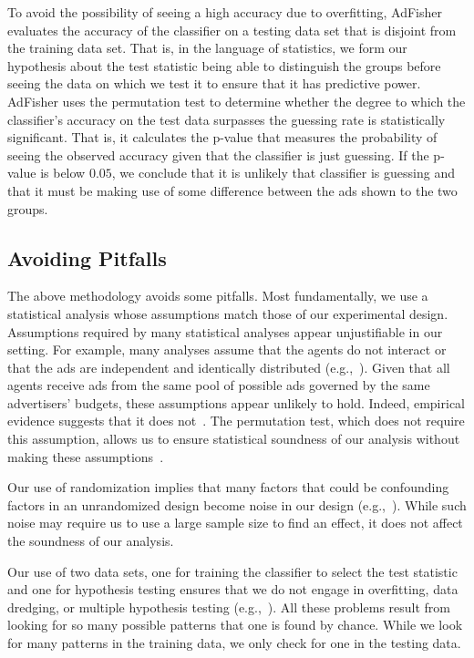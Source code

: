 \documentclass{article}
\begin{document}
To avoid the possibility of seeing a high accuracy due to overfitting, AdFisher evaluates the accuracy of the classifier on a testing data set that is disjoint from the training data set.  That is, in the language of statistics, we form our hypothesis about the test statistic being able to distinguish the groups before seeing the data on which we test it to ensure that it has predictive power.  AdFisher uses the permutation test to determine whether the degree to which the classifier's accuracy on the test data surpasses the guessing rate is statistically significant.  That is, it calculates the p-value that measures the probability of seeing the observed accuracy given that the classifier is just guessing.  If the p-value is below $0.05$, we conclude that it is unlikely that classifier is guessing and that it must be making use of some difference between the ads shown to the two groups.





\subsection{Avoiding Pitfalls}
\label{sec:pitfalls}
The above methodology avoids some pitfalls.
Most fundamentally, we use a statistical analysis whose assumptions match those of our experimental design.
Assumptions required by many statistical analyses appear unjustifiable in our setting.  
For example, many analyses assume that the agents do not interact or that the ads are independent and identically distributed (e.g.,~\cite{barford14www,englehardt14man}).  
Given that all agents receive ads from the same pool of possible ads governed by the same advertisers' budgets, these assumptions appear unlikely to hold.
Indeed, empirical evidence suggests that it does not~\cite{tschantz14arxiv}.
The permutation test, which does not require this assumption, allows us to ensure  statistical soundness of our analysis without making these assumptions~\cite{greenland86epidemiology}.

Our use of randomization implies that many factors that could be confounding factors in an unrandomized design become noise in our design (e.g.,~\cite{good05book}).  While such noise may require us to use a large sample size to find an effect, it does not affect the soundness of our analysis.

Our use of two data sets, one for training the classifier to select the test statistic and one for hypothesis testing ensures that we do not engage in overfitting, data dredging, or multiple hypothesis testing (e.g.,~\cite{mitchell97book}).  All these problems result from looking for so many possible patterns that one is found by chance.  While we look for many patterns in the training data, we only check for one in the testing data.
\end{document}
